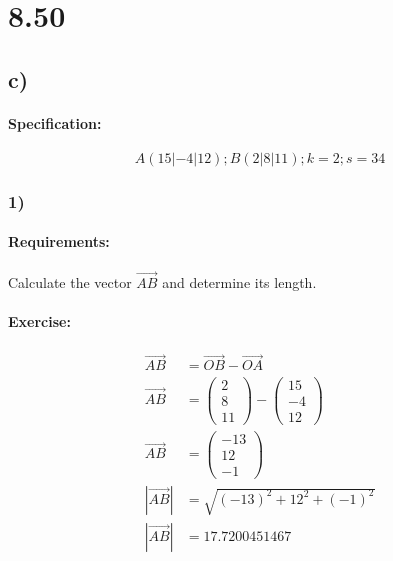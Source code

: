 \documentclass{article}
\begin{document}
\pagebreak

\section{8.50}

\subsection{c)}

\paragraph{Specification:}
\begin{equation}
    A(15|-4|12);B(2|8|11);k=2;s=34
\end{equation}

\subsubsection{1)}

\paragraph{Requirements:}
Calculate the vector $\vec{AB}$ and determine its length.

\paragraph{Exercise:}

\begin{align}
    \vec{AB} &= \vec{OB} - \vec{OA} \\ 
    \vec{AB} &= \begin{pmatrix}
        2 \\ 
        8 \\ 
        11
    \end{pmatrix} - 
    \begin{pmatrix}
        15 \\ 
        -4 \\
        12
    \end{pmatrix} \\
    \vec{AB} &= \begin{pmatrix}
        -13 \\ 
        12 \\
        -1
    \end{pmatrix} \\
    |\vec{AB}| &= \sqrt{(-13)^2 + 12^2 + (-1)^2} \\
    |\vec{AB}| &= 17.7200451467 
\end{align}
\end{document}
